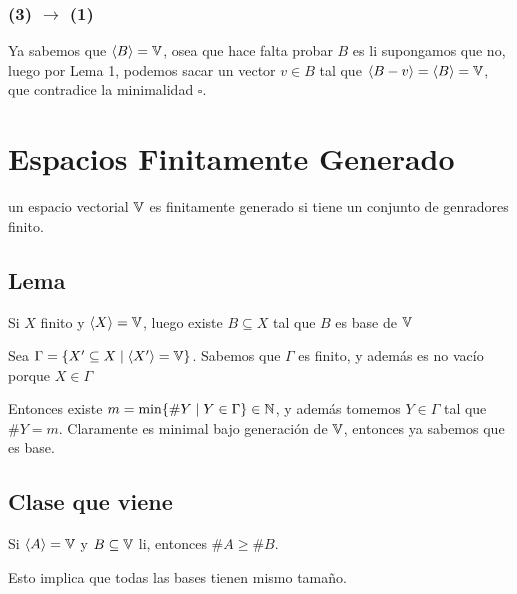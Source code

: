 \documentclass{article}
\begin{document}
\subsubsection{(3) $\to$ (1)}
Ya sabemos que $\langle B \rangle = \mathbb{V}$, osea que hace falta probar $B$ es li
supongamos que no, luego por Lema 1, podemos sacar un vector $v \in B$ tal que
$\langle B - v \rangle = \langle B \rangle = \mathbb{V}$, que contradice la minimalidad
$\square$.

\section{Espacios Finitamente Generado}
un espacio vectorial $\mathbb{V}$ es finitamente generado si tiene un conjunto de
genradores finito.
\subsection{Lema}
Si $X$ finito y $\langle X \rangle = \mathbb{V}$, luego existe $B \subseteq X$ tal que $B$ es
base de $\mathbb{V}$

Sea $\Gamma = \{X' \subseteq X \mid \langle X' \rangle = \mathbb{V} \}$. 
Sabemos que $\Gamma$ es finito, y además es no vacío porque $X \in \Gamma$

Entonces existe $m = \min \{\#Y \mid Y \in \Gamma\} \in \mathbb{N}$, y además tomemos
$Y \in \Gamma$ tal que $\#Y = m$. Claramente es minimal bajo generación de $\mathbb{V}$,
entonces ya sabemos que es base.

\subsection{Clase que viene}
Si $\langle A \rangle = \mathbb{V}$ y $B \subseteq \mathbb{V}$ li, entonces $\# A \geq \#B$.

Esto implica que todas las bases tienen mismo tamaño.
\end{document}
